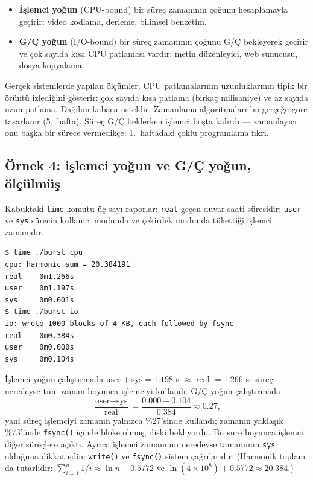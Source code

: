 \documentclass[11pt,a4paper]{article}
\newcommand{\term}[1]{\textbf{\color{mintdeep}#1}}
\newcommand{\cmd}[1]{\texttt{#1}}
\begin{document}
\begin{itemize}
  \item \term{İşlemci yoğun} (CPU-bound) bir süreç zamanının çoğunu hesaplamayla geçirir: video kodlama, derleme, bilimsel benzetim.
  \item \term{G/Ç yoğun} (I/O-bound) bir süreç zamanının çoğunu G/Ç bekleyerek geçirir ve çok sayıda kısa CPU patlaması vardır: metin düzenleyici, web sunucusu, dosya kopyalama.
\end{itemize}

Gerçek sistemlerde yapılan ölçümler, CPU patlamalarının uzunluklarının tipik bir örüntü izlediğini gösterir: çok sayıda kısa patlama (birkaç milisaniye) ve az sayıda uzun patlama. Dağılım kabaca üsteldir. Zamanlama algoritmaları bu gerçeğe göre tasarlanır (5.~hafta). Süreç G/Ç beklerken işlemci boşta kalırdı --- zamanlayıcı onu başka bir sürece vermedikçe: 1.~haftadaki çoklu programlama fikri.

\subsection{Örnek 4: işlemci yoğun ve G/Ç yoğun, ölçülmüş}



Kabuktaki \cmd{time} komutu üç sayı raporlar: \texttt{real} geçen duvar saati süresidir; \texttt{user} ve \texttt{sys} sürecin kullanıcı modunda ve çekirdek modunda tükettiği işlemci zamanıdır.

\begin{lstlisting}[style=term]
$ time ./burst cpu
cpu: harmonic sum = 20.384191
real    0m1.266s
user    0m1.197s
sys     0m0.001s
$ time ./burst io
io: wrote 1000 blocks of 4 KB, each followed by fsync
real    0m0.384s
user    0m0.000s
sys     0m0.104s
\end{lstlisting}

\begin{example}
İşlemci yoğun çalıştırmada $\text{user}+\text{sys} = 1.198$ s $\approx$ real $= 1.266$ s: süreç neredeyse tüm zaman boyunca işlemciyi kullandı. G/Ç yoğun çalıştırmada
\[
\frac{\text{user} + \text{sys}}{\text{real}} = \frac{0.000 + 0.104}{0.384} \approx 0.27,
\]
yani süreç işlemciyi zamanın yalnızca \%27'sinde kullandı; zamanın yaklaşık \%73'ünde \cmd{fsync()} içinde bloke olmuş, diski bekliyordu. Bu süre boyunca işlemci diğer süreçlere açıktı. Ayrıca işlemci zamanının neredeyse tamamının \texttt{sys} olduğuna dikkat edin: \cmd{write()} ve \cmd{fsync()} sistem çağrılarıdır. (Harmonik toplam da tutarlıdır: $\sum_{i=1}^{n} 1/i \approx \ln n + 0.5772$ ve $\ln(4\times10^{8}) + 0.5772 \approx 20.384$.)
\end{example}
\end{document}
